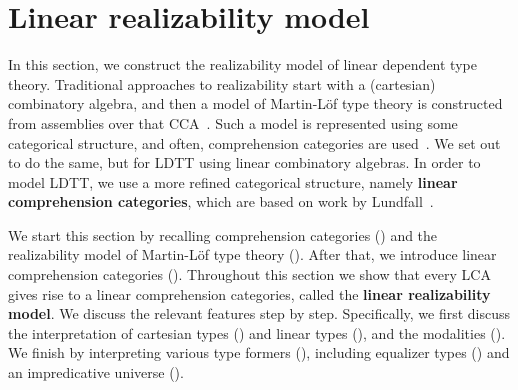 \documentclass[a4paper,UKenglish,cleveref,numberwithinsect, autoref, thm-restate]{lipics-v2021}
\begin{document}
\section{Linear realizability model}
\label{sec:linearrealizabilitymodel}
In this section, 
we construct the realizability model of linear dependent type theory. %
Traditional approaches to realizability start with a (cartesian) combinatory algebra,
and then a model of Martin-L\"of type theory is constructed from assemblies over that CCA~\cite{luo:1990,reus:1999a}.
Such a model is represented using some categorical structure,
and often, comprehension categories are used~\cite{jacobs:2001}.
We set out to do the same, but for LDTT using linear combinatory algebras.
In order to model LDTT,
we use a more refined categorical structure,
namely \textbf{linear comprehension categories},
which are based on work by Lundfall~\cite{lundfall:2017,Lundfall2018DiagramModel}.

We start this section by recalling comprehension categories () and the realizability model of Martin-L\"of type theory ().
After that,
we introduce linear comprehension categories ().
Throughout this section we show that every LCA gives rise to a linear comprehension categories, called the \textbf{linear realizability model}.
We discuss the relevant features step by step.
Specifically,
we first discuss the interpretation of cartesian types ()
and linear types (),
and the modalities ().
We finish by interpreting various type formers (),
including equalizer types () and an impredicative universe ().
\end{document}
